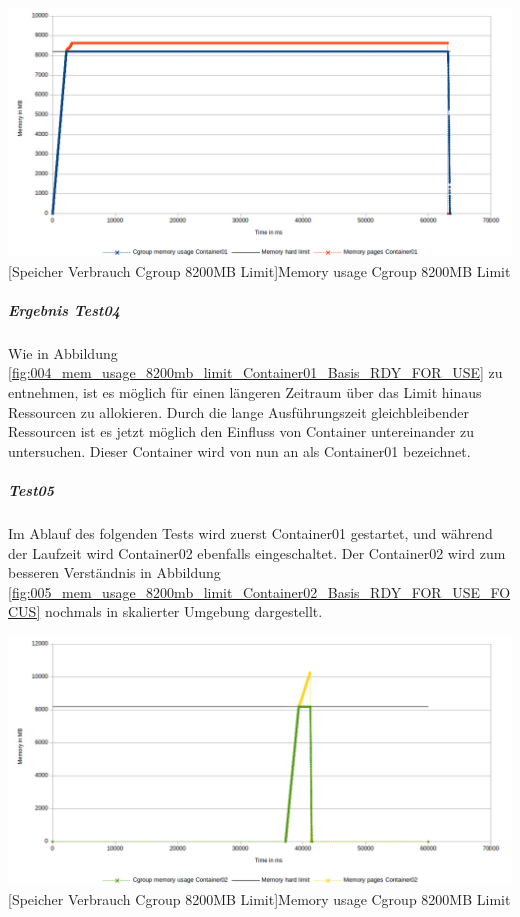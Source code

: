 \vspace{1em}
\begin{minipage}{\linewidth}
	\centering
	\includegraphics[width=1\linewidth]{pics/004_mem_usage_8200mb_limit_Container01_Basis_RDY_FOR_USE.png}
	[Speicher Verbrauch Cgroup 8200MB Limit]{Memory usage Cgroup 8200MB Limit}
	\label{fig:004_mem_usage_8200mb_limit_Container01_Basis_RDY_FOR_USE}
\end{minipage}

\subparagraph{Ergebnis Test04}
Wie in Abbildung \ref{fig:004_mem_usage_8200mb_limit_Container01_Basis_RDY_FOR_USE} zu entnehmen, ist es möglich für einen längeren Zeitraum über das Limit hinaus Ressourcen zu allokieren. Durch die lange Ausführungszeit gleichbleibender Ressourcen ist es jetzt möglich den Einfluss von Container untereinander zu untersuchen. Dieser Container wird von nun an als Container01 bezeichnet.

\subparagraph{Test05}
Im Ablauf des folgenden Tests wird zuerst Container01 gestartet, und während der Laufzeit wird Container02 ebenfalls eingeschaltet. Der Container02 wird zum besseren Verständnis in Abbildung \ref{fig:005_mem_usage_8200mb_limit_Container02_Basis_RDY_FOR_USE_FOCUS} nochmals in skalierter Umgebung dargestellt. 


\vspace{1em}
\begin{minipage}{\linewidth}
	\centering
	\includegraphics[width=1\linewidth]{pics/005_mem_usage_8200mb_limit_Container02_Basis_RDY_FOR_USE_FOCUS.png}
	[Speicher Verbrauch Cgroup 8200MB Limit]{Memory usage Cgroup 8200MB Limit}
	\label{fig:005_mem_usage_8200mb_limit_Container02_Basis_RDY_FOR_USE_FOCUS}
\end{minipage}

